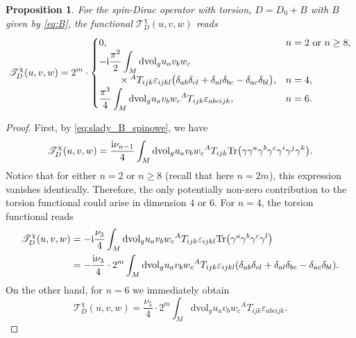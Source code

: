 \documentclass[pdftex]{sigma}
\numberwithin{equation}{section}
\newtheorem{Proposition}[Theorem]{Proposition}
\theoremstyle{definition}
\def\Tr{\mathrm{Tr}}
\def\dv{\mathrm{dvol}_g}
\begin{document}
\begin{Proposition}
	For the spin-Dirac operator with torsion, $D=D_0+B$ with $B$ given by \eqref{eq:B}, the functional $\mathscr{T}_{D}^\chi(u,v,w)$ reads
 \[
 \mathscr{T}_{D}^\chi(u,v,w)=2^m \cdot \begin{cases}
 0, & n=2 \text{ or } n\geq 8,\\
 \displaystyle -{\rm i} \frac{\pi^2}{2} \int_M \dv u_a v_b w_c &\\
 \qquad {} \times {}^AT_{ijk} \varepsilon_{ijkl}
 \bigl(\delta_{ab}\delta_{cl} + \delta_{al}\delta_{bc}-\delta_{ac}\delta_{bl}\bigr), & n=4,\\
\displaystyle \frac{\pi^3}{4}\int_M\dv u_av_b w_c {}^AT_{ijk} \varepsilon_{abcijk}, & n=6.
 \end{cases}
 \]
\end{Proposition}
\begin{proof}
First, by \eqref{eq:slady_B_spinowe}, we have
\[
 \mathscr{T}^\chi_D(u,v,w)=\frac{{\rm i}\nu_{n-1}}{4}\int_M \dv u_a v_b w_c {}^AT_{ijk} \Tr\bigl(\gamma \gamma^a\gamma^b\gamma^c\gamma^i\gamma^j\gamma^k\bigr).
\]
Notice that for either $n=2$ or $n\geq 8$ (recall that here $n=2m$), this expression vanishes identically. Therefore, the only potentially non-zero contribution to the torsion functional could arise in dimension $4$ or $6$. For $n=4$, the torsion functional reads
\begin{align*}
 \mathscr{T}^\chi_D(u,v,w)&=-{\rm i}\frac{\nu_3}{4}\int_M \dv u_a v_b w_c {}^AT_{ijk} \varepsilon_{ijkl} \Tr\bigl(\gamma^a\gamma^b \gamma^c \gamma^l\bigr)
 \\
 &=-\frac{{\rm i}\nu_3}{4} \cdot 2^m\int_M \dv u_a v_b w_c {}^AT_{ijk} \varepsilon_{ijkl}
 (\delta_{ab}\delta_{cl} + \delta_{al}\delta_{bc}-\delta_{ac}\delta_{bl}).
 \end{align*}
On the other hand, for $n=6$ we immediately obtain
\[
 \mathscr{T}^\chi_D(u,v,w)=\frac{\nu_5}{4}\cdot 2^m\int_M\dv u_av_b w_c {}^AT_{ijk} \varepsilon_{abcijk}.\tag*{\qed}
\] \renewcommand{\qed}{}
\end{proof}
\end{document}
